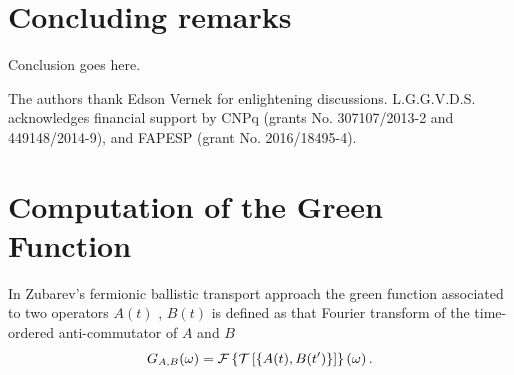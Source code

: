 \documentclass[showpacs,aps,prb,reprint,superscriptaddress]{revtex4-1}
\newcommand{\LUIS}[1]{\textcolor{blue}{\fbox{Luis} {\sl#1}}}
\begin{document}
    
\section{Concluding remarks}
\label{sec:Conclusions}

Conclusion goes here.

\begin{acknowledgments}
The authors thank Edson Vernek for enlightening discussions.  L.G.G.V.D.S. acknowledges financial support by CNPq (grants No. 307107/2013-2 and 449148/2014-9), and FAPESP (grant No. 2016/18495-4).
\end{acknowledgments}





%


 \appendix

 
 \section{Computation of the Green Function \label{sec:Appendix_alg}}
 In Zubarev's fermionic ballistic transport approach \cite{zubarev_double-time_1960} the green function associated to two operators $A(t)$ , $B(t)$ is defined as that Fourier transform of the time-ordered anti-commutator of $A$ and $B$
\begin{equation}
  G_{A,B}(\omega)= \mathcal{F}\left\{ \mathcal{T}\left[\left\{ A(t),B(t')\right\} \right]\right\} \left(\omega\right).
  \label{eq:greenFunction}
\end{equation}
\end{document}
